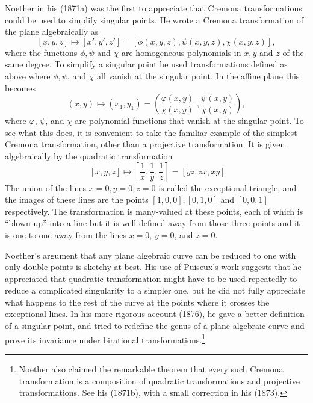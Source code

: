 Noether in his (1871a) was the first to appreciate that Cremona transformations could be used to simplify singular points.  He wrote a Cremona transformation of the plane algebraically as 
$$
[x,y,z] \mapsto [x',y',z'] = [\phi (x,y,z), \psi (x, y, z),  \chi (x, y, z)], 
$$
where the functions $\phi, \psi$ and $\chi$ are homogeneous polynomials in $x, y$ and $z$ of the same degree. To simplify a singular point he used
transformations defined as above where $\phi, \psi$, and $\chi$ all vanish at the singular point.  In the affine plane this becomes
$$(x , y) \mapsto (x_1 , y_1) = \left(\frac{\varphi (x, y)}{\chi (x, y)}\;,  \frac{\psi (x, y)}{\chi (x, y)} \right),$$
where $\varphi$, $\psi$, and $\chi$ are polynomial functions that vanish at the singular point.  To see what this does, it is convenient to take the familiar example of 
the simplest  Cremona transformation, other than a projective transformation. It  is given algebraically by  the quadratic transformation 
\begin{equation}~\label{eq:qt1}
[x, y, z] \mapsto \left[\frac{1}{x}, \frac{1}{y}, \frac{1}{z}\right] = [yz, zx, xy]\end{equation}
The union of the lines $x=0,y=0,z=0$ is called the exceptional triangle, and the images of these lines are the points $[1, 0, 0], [0, 1, 0]$ and $[0, 0, 1]$ respectively.
The transformation is many-valued at these points, each of which is ``blown up'' into a line  but it is well-defined away from those three points and it is  one-to-one away from  the lines $x=0$, $y=0$, and $z = 0.$ 


Noether's argument that any plane algebraic curve can be reduced to one with only double points is sketchy at best. His use of Puiseux's work suggests that he appreciated that quadratic transformation might have to be used repeatedly to reduce a complicated singularity to a simpler one, but he did not  fully appreciate what happens to the rest of the curve at the points where it crosses the exceptional lines. In his more rigorous account  (1876),  he gave a better definition of a singular point, and tried to redefine the genus of a plane algebraic curve and prove its  invariance  under birational  transformations.\footnote{Noether also claimed  the remarkable theorem that every such Cremona transformation is a composition of quadratic transformations and projective transformations. See his (1871b), with a small correction in his (1873).} 


